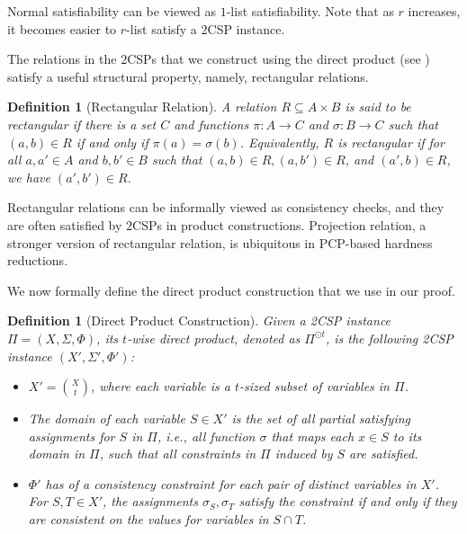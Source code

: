 \documentclass[10pt,a4paper]{article}
\newtheorem{definition}[theorem]{Definition}
\begin{document}
Normal satisfiability can be viewed as $1$-list satisfiability. Note that as $r$ increases, it becomes easier to $r$-list satisfy a 2CSP instance. 

The relations in the $2$CSPs that we construct using the direct product (see ) satisfy a useful structural property, namely, rectangular relations. 
\begin{definition}[Rectangular Relation]\label{def:rect}
    A relation $R \subseteq A \times B$ is said to be rectangular if there is a set $C$ and functions $\pi: A \to C$ and $\sigma: B \to C$ such that $(a,b) \in R$ if and only if $\pi(a)=\sigma(b)$. Equivalently, $R$ is rectangular if for all $a,a' \in A$ and $b,b' \in B$ such that $(a,b)\in R, (a,b')\in R$, and $(a',b) \in R$, we have $(a',b')\in R$.
\end{definition}

Rectangular relations can be informally viewed as consistency checks, and they are often satisfied by $2$CSPs in product constructions. Projection relation, a stronger version of rectangular relation, is ubiquitous in PCP-based hardness reductions.

We now formally define the direct product construction that we use in our proof. 
\begin{definition}[Direct Product Construction]\label{def:prod}
    Given a 2CSP instance $\Pi=(X,\Sigma,\Phi)$, its $t$-wise direct product, denoted as $\Pi^{\odot t}$, is the following 2CSP instance $(X',\Sigma',\Phi')$:
    \begin{itemize}
        \item $X'=\binom{X}{t}$, where each variable is a $t$-sized subset of variables in $\Pi$. 
        \item The domain of each variable $S \in X'$ is the set of all partial satisfying assignments for $S$ in $\Pi$, i.e., all function $\sigma$ that maps each $x \in S$ to its domain in $\Pi$, such that all constraints in $\Pi$ induced by $S$ are satisfied.
        \item $\Phi'$ has of a consistency constraint for each pair of distinct variables in $X'$. For $S,T \in X'$, the assignments $\sigma_S,\sigma_T$  satisfy the constraint if and only if they are consistent on the values for variables in $S \cap T$.
    \end{itemize}
\end{definition}
\end{document}
